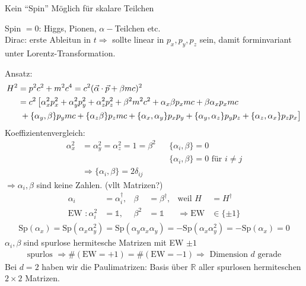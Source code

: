 Kein ``Spin'' Möglich für skalare Teilchen

Spin $=0$: Higgs, Pionen, $\alpha-$Teilchen etc.
\\
Dirac: erste Ableitun in $t \Rightarrow$ sollte linear in $p_x, p_y, p_z$ sein, damit forminvariant unter Lorentz-Transformation.

Ansatz:
	\begin{align*}
		H^2 &= p^2 c^2 + m^2 c^4 = c^2 (\vec{\alpha} \cdot \vec{p} + \beta m c)^2\\
		&= c^2 
		\left[
			\alpha_x^2 p_x^2 + \alpha_y^2 p_y^2 +\alpha_z^2 p_z^2
			+ \beta^2m^2c^2 + \alpha_x \beta p_x m c + \beta \alpha_x p_x mc \right.\\
			&\left.\vphantom{\alpha_x^2 p_x^2} + \{\alpha_y, \beta\} p_y mc + \{\alpha_z \beta \} p_z mc 
			+ \{\alpha_x, \alpha_y\} p_x p_y + \{\alpha_y, \alpha_z\} p_y p_z
			+\{\alpha_z, \alpha_x\}p_z p_x
 		\right]
	\end{align*}
Koeffizientenvergleich:
	\begin{align*}
		\alpha_x^2 &= \alpha_y^2 = \alpha_z^2 = 1 = \beta^2
		& &\boxed{\{\alpha_i, \beta \} = 0}\\
		& & &\{\alpha_i, \beta \} = 0 \text{ für } i \neq j \\
		&\Rightarrow \boxed{\{\alpha_i, \beta \} = 2 \delta_{ij}}
	\end{align*}
$\Rightarrow \alpha_i, \beta$ sind keine Zahlen. (vllt Matrizen?)
	\begin{align*}
		\alpha_i &= \alpha_i^\dagger ,&
		\beta &= \beta^\dagger ,& 
		\text{weil } H &= H^\dagger \\
		\text{EW }: \alpha_i^2 &= \mathds{1} ,&
		\beta^2 &= \mathds{1} 
		&\Rightarrow \mathrm{ EW } &\in \{\pm 1\}  
	\end{align*}
	\begin{align*}
		\mathrm{Sp}(\alpha_x) = \mathrm{Sp}(\alpha_x\alpha_y^2) 
		= \mathrm{Sp} (\alpha_y \alpha_x \alpha_y) 
		= - \mathrm{Sp}(\alpha_x \alpha_y^2) = -\mathrm{Sp}(\alpha_x) = 0
	\end{align*}
$\alpha_i, \beta$ sind spurlose hermitesche Matrizen mit EW $\pm 1$
	\begin{align*}
		\text{spurlos } \Rightarrow \# (\mathrm{EW } = + 1)
		= \# (\mathrm{EW } = - 1) \Rightarrow \text{ Dimension }d\text{ gerade}
	\end{align*}
Bei $d=2$ haben wir die Paulimatrizen: Basis über $\mathds{R}$ aller spurlosen hermiteschen $2 \times 2$ Matrizen.
